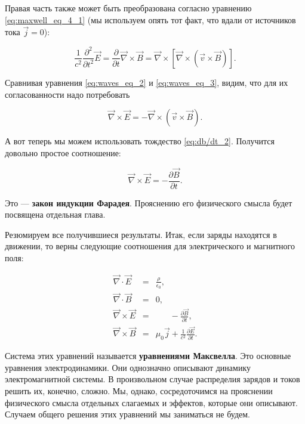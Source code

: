 \documentclass[a4paper,12pt]{article}
\newcommand{\pt}{\partial}
\newcommand{\eps}{\epsilon}
\newcommand{\vn}{\vec{\nabla}}
\begin{document}
Правая часть также может быть преобразована согласно уравнению
\eqref{eq:maxwell_eq_4_1} (мы используем опять тот факт, что вдали
от источников тока $\vec{j}=0$):

\begin{equation}
  \label{eq:waves_eq_3}
  \frac{1}{c^2} \frac{\pt^2}{\pt t^2} \vec{E} =
  \frac{\pt}{\pt t} \vn \times \vec{B} =  \vn \times \left[
  \vn \times \left( \vec{v} \times \vec{B}  \right)\right].
\end{equation}

Сравнивая уравнения \eqref{eq:waves_eq_2} и \eqref{eq:waves_eq_3},
видим, что для их согласованности надо потребовать

\begin{equation}
  \label{eq:waves_eq_4}
  \vn \times \vec{E} = - \vn \times \left( \vec{v} \times \vec{B}  \right).
\end{equation}

А вот теперь мы можем использовать тождество
\eqref{eq:db/dt_2}. Получится довольно простое соотношение: 

\begin{equation}
  \label{eq:faradays_law}
  \vn \times \vec{E} = -\frac{\pt \vec{B}}{\pt t}.
\end{equation}

Это --- \textbf{закон индукции Фарадея}. Прояснению его физического
смысла будет посвящена отдельная глава. 

Резюмируем все получившиеся результаты. Итак, если заряды находятся в
движении, то верны следующие соотношения для электрического и
магнитного поля: 

\begin{eqnarray}
  \label{eq:maxwell_eqs}
  \vn \cdot \vec{E} &=& \frac{\rho}{\eps_0},\\
  \vn \cdot \vec{B} &=& 0,\\
  \vn \times \vec{E} &=& \phantom{\mu_0 \vec{j}} -\frac{\pt \vec{B}}{\pt t},\\
  \vn \times \vec{B} &=& \mu_0 \vec{j} + \frac{1}{c^2}\frac{\pt
    \vec{E}}{\pt t}.
\end{eqnarray}

Система этих уравнений называется \textbf{уравнениями Максвелла}. Это
основные уравнения электродинамики. Они однозначно описывают динамику
электромагнитной системы. В произвольном случае распределия зарядов и
токов решить их, конечно, сложно. Мы, однако, сосредоточимся на
прояснении физического смысла отдельных слагаемых и эффектов, которые
они описывают. Случаем общего решения этих уравнений мы заниматься не
будем. 
\end{document}
